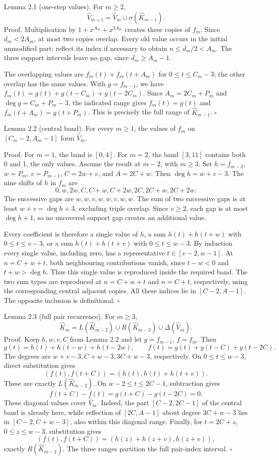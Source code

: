 \documentclass[11pt]{article}
\begin{document}
Lemma 2.1 (one-step values). For \(m\ge2\),
\[
\widehat V_{m+1}=\widehat V_m\cup\sigma(\widehat K_{m-1}).
\]
Proof. Multiplication by \(1+x^{A_m}+x^{2A_m}\) creates three copies of \(f_m\). Since \(d_m<2A_m\), at most two copies overlap. Every old value occurs in the initial unmodified part: reflect its index if necessary to obtain \(n\le d_m/2<A_m\). The three support intervals leave no gap, since \(d_m\ge A_m-1\).

The overlapping values are \(f_m(t)+f_m(t+A_m)\) for \(0\le t\le C_m-3\); the other overlap has the same values. With \(g=f_{m-1}\), we have \(f_m(t)=g(t)+g(t-C_m)+g(t-2C_m)\). Since \(A_m=2C_m+P_m\) and \(\deg g=C_m+P_m-3\), the indicated range gives \(f_m(t)=g(t)\) and \(f_m(t+A_m)=g(t+P_m)\). This is precisely the full range of \(\widehat K_{m-1}\). \(\square\)

Lemma 2.2 (central band). For every \(m\ge1\), the values of \(f_m\) on \([C_m-2,A_m-1]\) form \(\widehat V_m\).

Proof. For \(m=1\), the band is \([0,4]\). For \(m=2\), the band \([3,11]\) contains both 0 and 1, the only values. Assume the result at \(m-2\), with \(m\ge3\). Set \(h=f_{m-2}\), \(w=P_m\), \(v=P_{m-1}\), \(C=2w+v\), and \(A=2C+w\). Then \(\deg h=w+v-3\). The nine shifts of \(h\) in \(f_m\) are
\[
0,w,2w,C,C+w,C+2w,2C,2C+w,2C+2w.
\]
The successive gaps are \(w,w,v,w,w,v,w,w\). The sum of two successive gaps is at least \(w+v=\deg h+3\), excluding triple overlap. Since \(v\ge2\), each gap is at most \(\deg h+1\), so no uncovered support gap creates an additional value.

Every coefficient is therefore a single value of \(h\), a sum \(h(t)+h(t+w)\) with \(0\le t\le v-3\), or a sum \(h(t)+h(t+v)\) with \(0\le t\le w-3\). By induction every single value, including zero, has a representative \(t\in[v-2,w-1]\). At \(n=C+w+t\), both neighbouring contributions vanish, since \(t-w<0\) and \(t+w>\deg h\). Thus this single value is reproduced inside the required band. The two sum types are reproduced at \(n=C+w+t\) and \(n=C+t\), respectively, using the corresponding central adjacent copies. All these indices lie in \([C-2,A-1]\). The opposite inclusion is definitional. \(\square\)

Lemma 2.3 (full pair recurrence). For \(m\ge3\),
\[
\widehat K_m=L(\widehat K_{m-2})\cup R(\widehat K_{m-2})\cup\Delta(\widehat V_m).
\]
Proof. Keep \(h,w,v,C\) from Lemma 2.2 and let \(g=f_{m-1}\), \(f=f_m\). Then
\[
g(t)=h(t)+h(t-w)+h(t-2w),\qquad f(t)=g(t)+g(t-C)+g(t-2C).
\]
The degrees are \(w+v-3,C+w-3,3C+w-3\), respectively. On \(0\le t\le w-3\), direct substitution gives
\[
(f(t),f(t+C))=(h(t),h(t)+h(t+v)).
\]
These are exactly \(L(\widehat K_{m-2})\). On \(w-2\le t\le2C-1\), subtraction gives
\[
f(t+C)-f(t)=g(t+C)-g(t-2C)=0.
\]
These diagonal values cover \(\widehat V_m\). Indeed, the part \([C-2,2C-1]\) of the central band is already here, while reflection of \([2C,A-1]\) about degree \(3C+w-3\) lies in \([C-2,C+w-3]\), also within this diagonal range. Finally, for \(t=2C+z\), \(0\le z\le w-3\), substitution gives
\[
(f(t),f(t+C))=(h(z)+h(z+v),h(z+v)),
\]
exactly \(R(\widehat K_{m-2})\). The three ranges partition the full pair-index interval. \(\square\)
\end{document}
